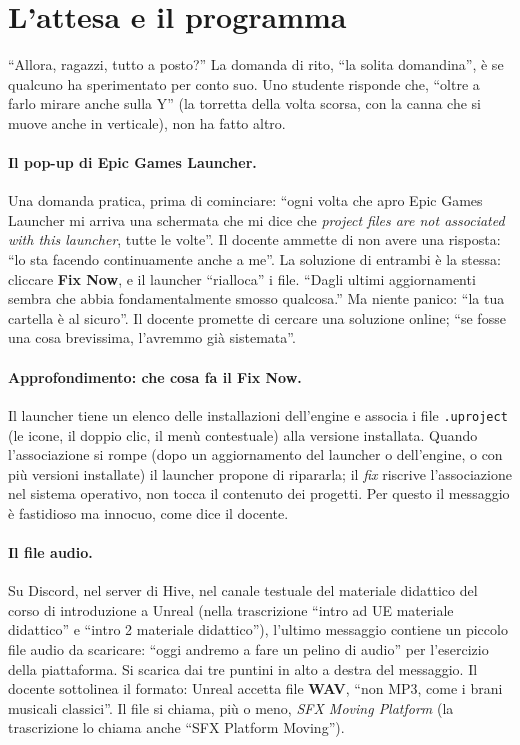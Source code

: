 \section{L'attesa e il programma}
\label{ue6:sec:attesa}

``Allora, ragazzi, tutto a posto?'' La domanda di rito, ``la solita domandina'', è se
qualcuno ha sperimentato per conto suo. Uno studente risponde che, ``oltre a farlo mirare
anche sulla Y'' (la torretta della volta scorsa, con la canna che si muove anche in
verticale), non ha fatto altro.

\paragraph{Il pop-up di Epic Games Launcher.} Una domanda pratica, prima di cominciare:
``ogni volta che apro Epic Games Launcher mi arriva una schermata che mi dice che
\emph{project files are not associated with this launcher}, tutte le volte''. Il
docente ammette di non avere una risposta: ``lo sta facendo continuamente anche a me''.
La soluzione di entrambi è la stessa: cliccare \textbf{Fix Now}, e il launcher
``rialloca'' i file. ``Dagli ultimi aggiornamenti sembra che abbia fondamentalmente
smosso qualcosa.'' Ma niente panico: ``la tua cartella è al sicuro''. Il docente promette
di cercare una soluzione online; ``se fosse una cosa brevissima, l'avremmo già
sistemata''.

\paragraph{Approfondimento: che cosa fa il Fix Now.} Il launcher tiene un elenco delle
installazioni dell'engine e associa i file \texttt{.uproject} (le icone, il doppio clic,
il menù contestuale) alla versione installata. Quando l'associazione si rompe (dopo un
aggiornamento del launcher o dell'engine, o con più versioni installate) il launcher
propone di ripararla; il \emph{fix} riscrive l'associazione nel sistema operativo, non
tocca il contenuto dei progetti. Per questo il messaggio è fastidioso ma innocuo, come
dice il docente.

\paragraph{Il file audio.} Su Discord, nel server di Hive, nel canale testuale del
materiale didattico del corso di introduzione a Unreal (nella trascrizione ``intro ad UE
materiale didattico'' e ``intro 2 materiale didattico''), l'ultimo messaggio contiene un
piccolo file audio da scaricare: ``oggi andremo a fare un pelino di audio'' per
l'esercizio della piattaforma. Si scarica dai tre puntini in alto a destra del messaggio.
Il docente sottolinea il formato: Unreal accetta file \textbf{WAV}, ``non MP3, come i
brani musicali classici''. Il file si chiama, più o meno, \emph{SFX Moving Platform} (la
trascrizione lo chiama anche ``SFX Platform Moving'').

